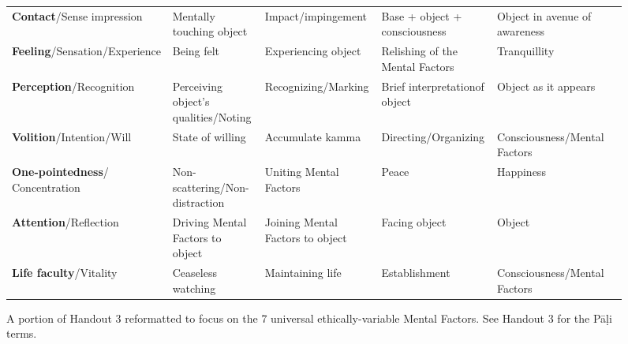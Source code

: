 \begin{figure} [H]

\setlength{\tabcolsep}{0pt}
\renewcommand{\arraystretch}{1.1}

\noindent\begin{tabular}{P{0.25\textwidth} | C{.185\textwidth} C{0.185\textwidth} C{0.185\textwidth} C{0.195\textwidth} m{0mm}}
\toprule
 &  &  &  & \\
\midrule
\textbf{Contact}/\newline Sense impression & Mentally touching object & Impact/\newline impingement & Base + object + consciousness & Object in avenue of awareness &\\[9mm]
\textbf{Feeling}/\newline Sensation/Experience & Being felt & Experiencing object & Relishing of the Mental Factors & Tranquillity &\\[9mm]
\textbf{Perception}/\newline Recognition & Perceiving object’s qualities/\newline Noting & Recognizing/\newline Marking & Brief interpretation\newline of object & Object as it appears &\\[9mm]
\textbf{Volition}/\newline Intention/Will & State of willing & Accumulate kamma & Directing/\newline Organizing & Consciousness/\newline Mental Factors &\\[9mm]
\textbf{One-pointedness}/ Concentration & Non-scattering/\newline Non-distraction & Uniting Mental Factors & Peace & Happiness &\\[9mm]
\textbf{Attention}/\newline Reflection & Driving Mental Factors to object & Joining Mental Factors to object & Facing object & Object &\\[9mm]
\textbf{Life faculty}/\newline Vitality & Ceaseless watching & Maintaining life & Establishment & Consciousness/\newline Mental Factors &\\[9mm]
\bottomrule
\end{tabular} 

\caption{A portion of Handout 3 reformatted to focus on the 7 universal ethically-variable Mental Factors. See Handout 3 for the Pāḷi terms.}

\end{figure}

